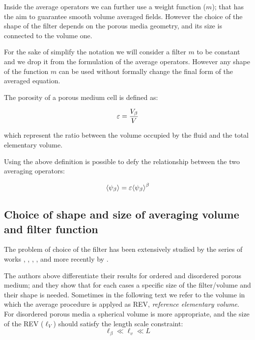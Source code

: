 Inside the average operators we can further use a weight function ($m$); that has the aim to guarantee smooth volume averaged fields.
However the choice of the shape of the filter depends on the porous media geometry, and its size is connected to the volume one.

For the sake of simplify the notation we will consider a filter $m$ to be constant and we drop it from the formulation of the average operators.
However any shape of the function $m$ can be used without formally change the final form of the averaged equation.

The porosity of a porous medium cell is defined as:

\begin{equation}
	\varepsilon = \dfrac{V_\beta}{V}
	\label{eq:porosity}
\end{equation}

which represent the ratio between the volume occupied by the fluid and the total elementary volume.

Using the above definition is possible to defy the relationship between the two averaging operators:

\begin{equation}
	{\left< \psi_{\beta} \right>} =  \varepsilon {\left< \psi_{\beta} \right>}^{\beta}
	\label{eq:means_vs_meani}
\end{equation}

\subsection{Choice of shape and size of averaging volume and filter function}
\label{ch:filter}

The problem of choice of the filter has been extensively studied by the series of works \citet{quintard1994transport1}, \citet{quintard1994transport2}, \citet{quintard1994transport3}, \citet{quintard1994transport4}, \citet{quintard1994transport5} and more recently by \citet{davit2017technical}.

The authors above differentiate their results for ordered and disordered porous medium; and they show that for each cases a specific size of the filter/volume and their shape is needed.
Sometimes in the following text we refer to the volume in which the average procedure is applyed as REV, \textit{reference elementary volume}.
For disordered porous media a spherical volume is more appropriate, and the size of the REV ($\ell_V$) should satisfy the length scale constraint:
$$
\ell_{\beta} \ll \ell_v \ll L
$$

